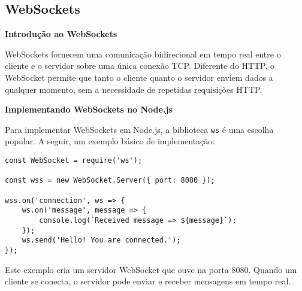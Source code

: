 \subsection{WebSockets}
\textbf{Introdução ao WebSockets}

WebSockets fornecem uma comunicação bidirecional em tempo real entre o cliente e o servidor sobre uma única conexão TCP. Diferente do HTTP, o WebSocket permite que tanto o cliente quanto o servidor enviem dados a qualquer momento, sem a necessidade de repetidas requisições HTTP.

\textbf{Implementando WebSockets no Node.js}

Para implementar WebSockets em Node.js, a biblioteca \texttt{ws} é uma escolha popular. A seguir, um exemplo básico de implementação:

\begin{verbatim}
const WebSocket = require('ws');

const wss = new WebSocket.Server({ port: 8080 });

wss.on('connection', ws => {
    ws.on('message', message => {
        console.log(`Received message => ${message}`);
    });
    ws.send('Hello! You are connected.');
});
\end{verbatim}

Este exemplo cria um servidor WebSocket que ouve na porta 8080. Quando um cliente se conecta, o servidor pode enviar e receber mensagens em tempo real.
















